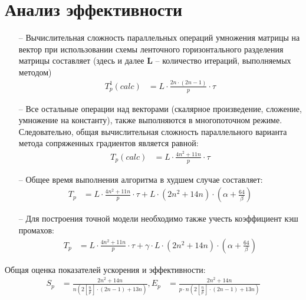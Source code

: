 \documentclass[12pt]{article}
\begin{document}
\section{\LARGE Анализ эффективности}
\begin{itemize}
	\item [--]Вычислительная сложность параллельных операций умножения матрицы на вектор при использовании схемы ленточного горизонтального разделения матрицы составляет (здесь и далее $\mathbf{L}$ – количество итераций, выполняемых методом)
\begin{align*}
T^1_p(calc) &= L \cdot \frac{2n \cdot (2n - 1)}{p} \cdot \tau
\end{align*}
	\item [--]Все остальные операции над векторами (скалярное произведение, сложение, умножение на константу), также выполняются в многопоточном режиме. \\Следовательно, общая вычислительная сложность параллельного варианта метода сопряженных градиентов является равной:
\begin{align*}
T_p(calc) &= L \cdot \frac{4n^2 + 11n}{p} \cdot \tau 
\end{align*}
	\item [--]Общее время выполнения алгоритма в худшем случае составляет:
\begin{align*}
T_p &= L \cdot \frac{4n^2 + 11n}{p} \cdot \tau + L \cdot (2n^2 + 14n) \cdot (\alpha + \frac{64}{\beta})
\end{align*}
	\item [--]Для построения точной модели необходимо также учесть
коэффициент кэш промахов:
\begin{align*}
T_p &= L \cdot \frac{4n^2 + 11n}{p} \cdot \tau + \gamma \cdot L \cdot (2n^2 + 14n) \cdot (\alpha + \frac{64}{\beta})
\end{align*}
\end{itemize}
Общая оценка показателей ускорения и эффективности:
\begin{align*}
S_p &= \frac{2n^2 + 14n}{n(2[\frac{n}{p}] \cdot (2n-1) + 13n)},
E_p &= \frac{2n^2 + 14n}{p \cdot n(2[\frac{n}{p}] \cdot (2n-1) + 13n)}
\end{align*}
\end{document}
